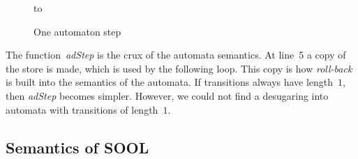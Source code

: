\documentclass[preprint]{sigplanconf} %
\theoremstyle{definition}
\theoremstyle{remark}
\begin{document}
\begin{figure}
\hbox to
\caption{One automaton step}
\label{fig:adStep}
\end{figure}

The function~\textit{adStep} is the crux of the automata semantics.
At line~5 a copy of the store is made, which is used by the following loop.
This copy is how \emph{roll-back} is built into the semantics of the automata.
If transitions always have length~$1$, then \textit{adStep} becomes simpler.
However, we could not find a desugaring into automata with transitions of length~$1$.

\subsection{Semantics of SOOL} \label{sec:semantics.sool} %
\end{document}
